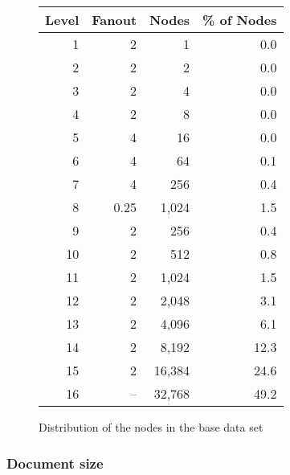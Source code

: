 \begin {figure}
\begin {center}
\renewcommand{\baselinestretch}{1.1}
\begin{tabular}{|r|r|r|r|} \hline
{\bf Level} & {\bf Fanout} & {\bf Nodes} & {\bf \% of Nodes} \\ \hline
1 & 2 & 1 & 0.0 \\ 2 & 2 & 2 & 0.0 \\ 3 & 2 & 4 & 0.0 \\ 4 & 2 & 8 &
0.0 \\ 5 & 4 & 16 & 0.0 \\ 6 & 4 & 64 & 0.1 \\ 7 & 4 & 256 & 0.4 \\ 8
& 0.25 & 1,024 & 1.5 \\ 9 & 2 & 256 & 0.4 \\ 10 & 2 & 512 & 0.8 \\ 11
& 2 & 1,024 & 1.5 \\ 12 & 2 & 2,048 & 3.1 \\ 13 & 2 & 4,096 & 6.1 \\
14 & 2 & 8,192 & 12.3 \\ 15 & 2 & 16,384 & 24.6 \\ 16 & -- & 32,768 &
49.2 \\ \hline
\end {tabular}
\caption{\label{table:dist}Distribution of the nodes in the base data
set}
\label{fig:fanout}
\renewcommand{\baselinestretch}{\cheatbaseline}
\end {center}
\end {figure}

\subsubsection{Document size}

